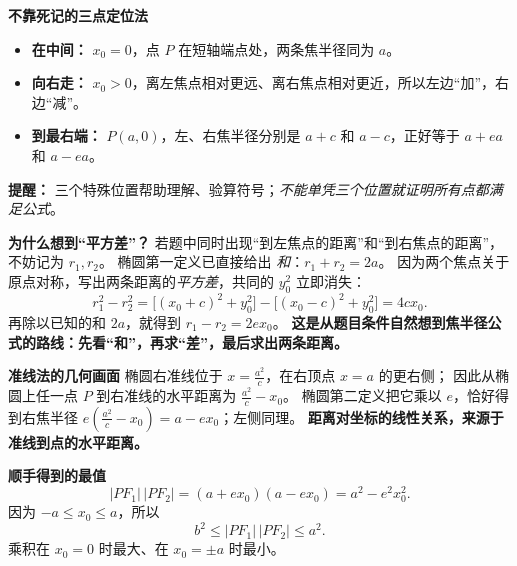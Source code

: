 \begin{explanationbox}
\medskip
\textbf{\textcolor{CExplanation}{不靠死记的三点定位法}}
\begin{itemize}[leftmargin=*, itemsep=0.35em, topsep=0.35em]
 \item \textbf{在中间：} $x_0=0$，点 $P$ 在短轴端点处，两条焦半径同为 $a$。
 \item \textbf{向右走：} $x_0>0$，离左焦点相对更远、离右焦点相对更近，所以左边“加”，右边“减”。
 \item \textbf{到最右端：} $P(a,0)$，左、右焦半径分别是 $a+c$ 和 $a-c$，正好等于 $a+ea$ 和 $a-ea$。
\end{itemize}
\textbf{提醒：} 三个特殊位置帮助理解、验算符号；\emph{不能单凭三个位置就证明所有点都满足公式}。

\medskip
\textbf{\textcolor{CExplanation}{为什么想到“平方差”？}}
若题中同时出现“到左焦点的距离”和“到右焦点的距离”，不妨记为 $r_1,r_2$。
椭圆第一定义已直接给出 \emph{和}：$r_1+r_2=2a$。
因为两个焦点关于原点对称，写出两条距离的\emph{平方差}，共同的 $y_0^2$ 立即消失：
\[
 r_1^2-r_2^2=\big[(x_0+c)^2+y_0^2\big]
 -\big[(x_0-c)^2+y_0^2\big]=4cx_0.
\]
再除以已知的和 $2a$，就得到 $r_1-r_2=2ex_0$。
\textbf{这是从题目条件自然想到焦半径公式的路线：先看“和”，再求“差”，最后求出两条距离。}

\medskip
\textbf{\textcolor{CExplanation}{准线法的几何画面}}
椭圆右准线位于 $x=\frac{a^2}{c}$，在右顶点 $x=a$ 的更右侧；
因此从椭圆上任一点 $P$ 到右准线的水平距离为 $\frac{a^2}{c}-x_0$。
椭圆第二定义把它乘以 $e$，恰好得到右焦半径
$e(\frac{a^2}{c}-x_0)=a-ex_0$；左侧同理。
\textbf{距离对坐标的线性关系，来源于准线到点的水平距离。}

\medskip
\textbf{\textcolor{CExplanation}{顺手得到的最值}}
\[
 |PF_1|\,|PF_2|=(a+ex_0)(a-ex_0)=a^2-e^2x_0^2.
\]
因为 $-a\le x_0\le a$，所以
\[
 \boxed{b^2\le |PF_1|\,|PF_2|\le a^2}.
\]
乘积在 $x_0=0$ 时最大、在 $x_0=\pm a$ 时最小。
\end{explanationbox}

